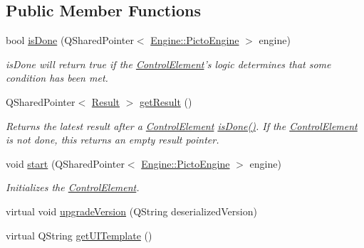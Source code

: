 \subsection*{Public Member Functions}
\begin{DoxyCompactItemize}
\item 
\hypertarget{class_picto_1_1_script_controller_a2e338d3c263bc259c69812b5c7b8cb10}{bool \hyperlink{class_picto_1_1_script_controller_a2e338d3c263bc259c69812b5c7b8cb10}{is\-Done} (Q\-Shared\-Pointer$<$ \hyperlink{class_picto_1_1_engine_1_1_picto_engine}{Engine\-::\-Picto\-Engine} $>$ engine)}\label{class_picto_1_1_script_controller_a2e338d3c263bc259c69812b5c7b8cb10}

\begin{DoxyCompactList}\small\item\em is\-Done will return true if the \hyperlink{class_picto_1_1_control_element}{Control\-Element}'s logic determines that some condition has been met. \end{DoxyCompactList}\item 
\hypertarget{class_picto_1_1_script_controller_ac32cbda0f2990423567bc53b69516b4f}{Q\-Shared\-Pointer$<$ \hyperlink{class_picto_1_1_result}{Result} $>$ \hyperlink{class_picto_1_1_script_controller_ac32cbda0f2990423567bc53b69516b4f}{get\-Result} ()}\label{class_picto_1_1_script_controller_ac32cbda0f2990423567bc53b69516b4f}

\begin{DoxyCompactList}\small\item\em Returns the latest result after a \hyperlink{class_picto_1_1_control_element}{Control\-Element} \hyperlink{class_picto_1_1_script_controller_a2e338d3c263bc259c69812b5c7b8cb10}{is\-Done()}. If the \hyperlink{class_picto_1_1_control_element}{Control\-Element} is not done, this returns an empty result pointer. \end{DoxyCompactList}\item 
void \hyperlink{class_picto_1_1_script_controller_a38429c7fc5689ad63bb43b6590e47365}{start} (Q\-Shared\-Pointer$<$ \hyperlink{class_picto_1_1_engine_1_1_picto_engine}{Engine\-::\-Picto\-Engine} $>$ engine)
\begin{DoxyCompactList}\small\item\em Initializes the \hyperlink{class_picto_1_1_control_element}{Control\-Element}. \end{DoxyCompactList}\item 
virtual void \hyperlink{class_picto_1_1_script_controller_a78d4532ff6719d9252f1b993636b19b9}{upgrade\-Version} (Q\-String deserialized\-Version)
\item 
\hypertarget{class_picto_1_1_script_controller_a58c7da4ad9cec9e457eb7d42c66c875f}{virtual Q\-String \hyperlink{class_picto_1_1_script_controller_a58c7da4ad9cec9e457eb7d42c66c875f}{get\-U\-I\-Template} ()}\label{class_picto_1_1_script_controller_a58c7da4ad9cec9e457eb7d42c66c875f}


\end{DoxyCompactItemize}
